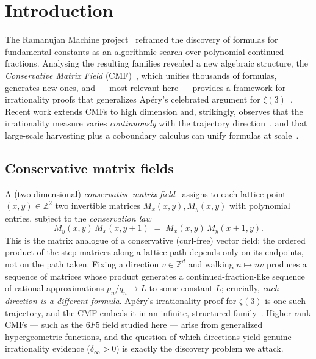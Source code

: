 \documentclass[11pt,a4paper]{article}
\theoremstyle{definition}
\newcommand{\Z}{\mathbb{Z}}
\begin{document}
\section{Introduction}

The Ramanujan Machine project~\cite{raayoni2021} reframed the discovery of formulas for
fundamental constants as an algorithmic search over polynomial continued fractions. Analysing
the resulting families revealed a new algebraic structure, the \emph{Conservative Matrix
Field} (CMF)~\cite{cmf2023,elimelech2024}, which unifies thousands of formulas, generates new
ones, and --- most relevant here --- provides a framework for irrationality proofs that
generalizes Ap\'ery's celebrated argument for $\zeta(3)$~\cite{apery1979,vanderpoorten1979}.
Recent work extends CMFs to high dimension and, strikingly, observes that the irrationality
measure varies \emph{continuously} with the trajectory direction~\cite{cmfcont2025}, and that
large-scale harvesting plus a coboundary calculus can unify formulas at
scale~\cite{euler2ai2025}.

\subsection{Conservative matrix fields}
A (two-dimensional) \emph{conservative matrix field}~\cite{cmf2023,elimelech2024} assigns to
each lattice point $(x,y)\in\Z^2$ two invertible matrices $M_x(x,y),M_y(x,y)$ with polynomial
entries, subject to the \emph{conservation law}
\[
  M_y(x,y)\,M_x(x,y+1) \;=\; M_x(x,y)\,M_y(x+1,y).
\]
This is the matrix analogue of a conservative (curl-free) vector field: the ordered product of
the step matrices along a lattice path depends only on its endpoints, not on the path taken.
Fixing a direction $v\in\Z^{d}$ and walking $n\mapsto nv$ produces a sequence of matrices whose
product generates a continued-fraction-like sequence of rational approximations $p_n/q_n\to L$
to some constant $L$; crucially, \emph{each direction is a different formula}. Ap\'ery's
irrationality proof for $\zeta(3)$ is one such trajectory, and the CMF embeds it in an infinite,
structured family~\cite{cmf2023,elimelech2024,cmfcont2025}. Higher-rank CMFs --- such as the
$6F5$ field studied here --- arise from generalized hypergeometric functions, and the question
of which directions yield genuine irrationality evidence ($\delta_\infty>0$) is exactly the
discovery problem we attack.
\end{document}

